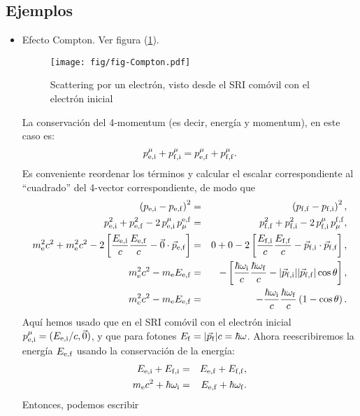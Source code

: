 \subsection{Ejemplos}
\begin{itemize}
\item Efecto Compton. Ver figura (\ref{fig:Compton}).
\begin{figure}[ht]
\centerline{\texttt{[image: fig/fig-Compton.pdf]}}
\caption{Scattering por un electrón, visto desde el SRI comóvil con el electrón inicial}
\label{fig:Compton}
\end{figure}
La conservación del 4-momentum (es decir, energía y momentum), en este caso
es:
\begin{equation}
p^\mu_{\rm e,i}+p^\mu_{\rm f,i}=p^\mu_{\rm e,f}+p^\mu_{\rm f,f}.
\end{equation}
Es conveniente reordenar los términos y calcular el escalar correspondiente al
``cuadrado'' del 4-vector correspondiente, de modo que
\begin{eqnarray}
\left( p_{\rm e,i}-p_{\rm e,f}\right)^2 &=&\left( p_{\rm f,f}-p_{\rm
f,i}\right)^2 ,\\
p^2_{\rm e,i}+p^2_{\rm e,f}-2\,p^\mu_{\rm e,i}\,p_\mu^{\rm e,f} &=& p^2_{\rm
f,f}+p^2_{\rm f,i}-2\,p^\mu_{\rm f,i}\,p_\mu^ {\rm f,f},\\
m_{\rm e}^2 c^2+m_{\rm e}^2 c^2-2\left[\frac{E_{\rm e,i}}{c}\frac{E_{\rm e,f}}{c}-\vec{0}\cdot\vec{p}_{\rm e,f}\right] &=&
0+0-2\left[\frac{E_{\rm f,i}}{c}\frac{E_{\rm f,f}}{c}-\vec{p}_{\rm
f,i}\cdot\vec{p}_{\rm f,f}\right] ,\\
m_{\rm e}^2 c^2-m_{\rm e}E_{\rm e,f} &=& -\left[
\frac{\hbar\omega_{\rm i}}{c}\frac{\hbar\omega_{\rm f}}{c}-|\vec{p}_{\rm f,i}||\vec{p}_{\rm f,f}|\cos\theta\right] , \\
m_{\rm e}^2 c^2-m_{\rm e}E_{\rm e,f} &=&
-\frac{\hbar\omega_{\rm i}}{c}\frac{\hbar\omega_{\rm f}}{c}\left(1 -\cos\theta\right) .
\end{eqnarray}
Aquí hemos usado que en el SRI comóvil con el electrón inicial $p^\mu_{\rm
e,i}=({E_{\rm e,i}}/{c},\vec{0})$, y que para fotones $E_{\rm
f}=|\vec{p}_{\rm f}|c=\hbar\omega$. Ahora reescribiremos la energía $E_{\rm
e,f}$ usando la conservación de la energía:
\begin{eqnarray}
E_{\rm e,i}+E_{\rm f,i}&=&E_{\rm e,f}+E_{\rm f,f}, \\
m_{\rm e}c^2+\hbar\omega_{\rm i} &=&E_{\rm e,f}+\hbar\omega_{\rm f} .
\end{eqnarray}
Entonces, podemos escribir
\begin{eqnarray}

\end{eqnarray}
\end{itemize}

